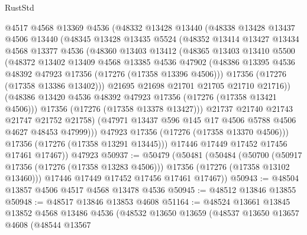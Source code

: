\begin{lexlean}{RustStd}
\begin{coremodule}
            @4517
            @4568
            @13369
            @4536
            (@48332
              @13428
              @13440
              (@48338
                @13428
                @13437
                @4506
                @13440
                (@48345
                  @13428
                  @13435
                  @5524
                  (@48352
                    @13414
                    @13427
                    @13434
                    @4568
                    @13377
                    @4536
                    (@48360
                      @13403
                      @13412
                      (@48365
                        @13403
                        @13410
                        @5500
                        (@48372
                          @13402
                          @13409
                          @4568
                          @13385
                          @4536
                          @47902
                          (@48386 @13395 @4536 @48392 @47923 @17356 (@17276 (@17358 @13396 @4506)))
                          @17356
                          (@17276 (@17358 @13386 @13402)))
                        @21695
                        @21698
                        @21701
                        @21705
                        @21710
                        @21716))
                    (@48386 @13420 @4536 @48392 @47923 @17356 (@17276 (@17358 @13421 @4506)))
                    @17356
                    (@17276 (@17358 @13378 @13427)))
                  @21737
                  @21740
                  @21743
                  @21747
                  @21752
                  @21758)
                (@47971 @13437 @596 @145 @17 @4506 @5788 @4506 @4627 @48453 @47999)))
            @47923
            @17356
            (@17276 (@17358 @13370 @4506)))
          @17356
          (@17276 (@17358 @13291 @13445)))
        @17446
        @17449
        @17452
        @17456
        @17461
        @17467))
    @47923
@50937 := @50479
    (@50481
      (@50484
        (@50700
          (@50917 @17356 (@17276 (@17358 @13283 @4506)))
          @17356
          (@17276 (@17358 @13102 @13460)))
        @17446
        @17449
        @17452
        @17456
        @17461
        @17467))
@50943 := @48504 @13857 @4506 @4517 @4568 @13478 @4536
@50945 := @48512 @13846 @13855
@50948 := @48517 @13846 @13853 @4608
@51164 := @48524
    @13661
    @13845
    @13852
    @4568
    @13486
    @4536
    (@48532
      @13650
      @13659
      (@48537
        @13650
        @13657
        @4608
        (@48544
          @13567

\end{coremodule}
\end{lexlean}
